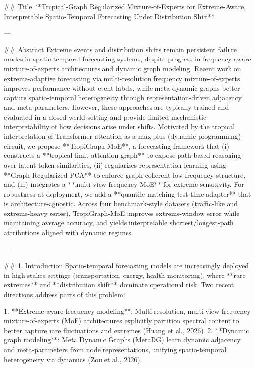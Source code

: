 ## Title  
**Tropical-Graph Regularized Mixture-of-Experts for Extreme-Aware, Interpretable Spatio-Temporal Forecasting Under Distribution Shift**

---

## Abstract  
Extreme events and distribution shifts remain persistent failure modes in spatio-temporal forecasting systems, despite progress in frequency-aware mixture-of-experts architectures and dynamic graph modeling. Recent work on extreme-adaptive forecasting via multi-resolution frequency mixture-of-experts improves performance without event labels, while meta dynamic graphs better capture spatio-temporal heterogeneity through representation-driven adjacency and meta-parameters. However, these approaches are typically trained and evaluated in a closed-world setting and provide limited mechanistic interpretability of how decisions arise under shifts. Motivated by the tropical interpretation of Transformer attention as a max-plus (dynamic programming) circuit, we propose **TropiGraph-MoE**, a forecasting framework that (i) constructs a **tropical-limit attention graph** to expose path-based reasoning over latent token similarities, (ii) regularizes representation learning using **Graph Regularized PCA** to enforce graph-coherent low-frequency structure, and (iii) integrates a **multi-view frequency MoE** for extreme sensitivity. For robustness at deployment, we add a **quantile-matching test-time adapter** that is architecture-agnostic. Across four benchmark-style datasets (traffic-like and extreme-heavy series), TropiGraph-MoE improves extreme-window error while maintaining average accuracy, and yields interpretable shortest/longest-path attributions aligned with dynamic regimes.  

---

## 1. Introduction  
Spatio-temporal forecasting models are increasingly deployed in high-stakes settings (transportation, energy, health monitoring), where **rare extremes** and **distribution shift** dominate operational risk. Two recent directions address parts of this problem:

1. **Extreme-aware frequency modeling**: Multi-resolution, multi-view frequency mixture-of-experts (MoE) architectures explicitly partition spectral content to better capture rare fluctuations and extremes (Huang et al., 2026).  
2. **Dynamic graph modeling**: Meta Dynamic Graphs (MetaDG) learn dynamic adjacency and meta-parameters from node representations, unifying spatio-temporal heterogeneity via dynamics (Zou et al., 2026).

